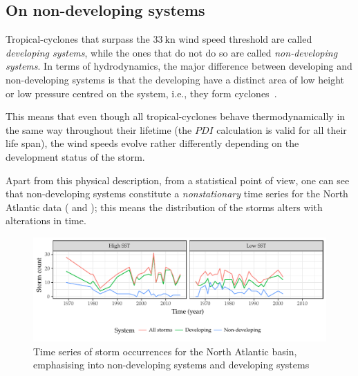 \subsection{On non-developing systems}
Tropical-cyclones that surpass the $\SI{33}{\knot}$ wind speed threshold are called \emph{developing systems}, while the ones that do not do so are called \emph{non-developing systems}. In terms of hydrodynamics, the major difference between developing and non-developing systems is that the developing have a distinct area of low height or low pressure centred on the system, i.e., they form cyclones~\cite{McBride1979}.

This means that even though all tropical-cyclones behave thermodynamically in the same way throughout their lifetime (the $PDI$ calculation is valid for all their life span), the wind speeds evolve rather differently depending on the development status of the storm.


\medskip
Apart from this physical description, from a statistical point of view, one can see that non-developing systems constitute a \emph{nonstationary} time series for the North Atlantic data ( and ); this means the distribution of the storms alters with alterations in time.

\begin{figure}[H]
	\centering
	\includegraphics[width=\textwidth]{images/natl-storms-ts}
	\caption{Time series of storm occurrences for the North Atlantic basin, emphasising into non-developing systems and developing systems}
	\label{fig:natl-storms-ts}
\end{figure}

